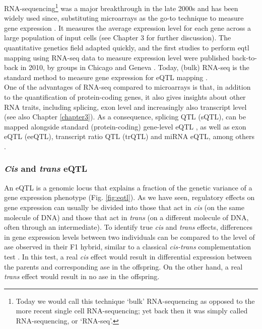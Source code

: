 RNA-sequencing\footnote{Today we would call this technique `bulk' RNA-sequencing as opposed to the more recent single cell RNA-sequencing; yet back then it was simply called RNA-sequencing, or `RNA-seq'.} was a major breakthrough in the late 2000s 
and has been widely used since, substituting microarrays as the go-to technique to measure gene expression \cite{weber2015discovering}.
It measures the average expression level for each gene across a large population 
of input cells (see Chapter 3 for further discussion).
The quantitative genetics field adapted quickly, and the first studies to perform \gls{eqtl} mapping using RNA-seq data to measure expression level were published back-to-back in 2010, by groups in Chicago and Geneva
\cite{montgomery2010transcriptome, pickrell2010understanding}.
Today, (bulk) RNA-seq is the standard method to measure gene expression for eQTL mapping \cite{lappalainen2013transcriptome, gtex2015genotype, chen2016genetic}.\\

One of the advantages of RNA-seq compared to microarrays is that, in addition to the quantification of protein-coding genes, it also  gives insights about other RNA traits, including splicing, exon level and increasingly also transcript level (see also Chapter
\ref{chapter3}).
As a consequence, splicing QTL (sQTL), can be mapped alongside standard (protein-coding) gene-level eQTL \cite{pickrell2010understanding, montgomery2010transcriptome}, as well as exon eQTL (eeQTL), transcript ratio QTL (trQTL) and miRNA eQTL, among others \cite{lappalainen2013transcriptome, bonder2019systematic}.
 
\subsubsection{\textit{Cis} and \textit{trans} eQTL}

An eQTL is a genomic locus that explains a fraction of the genetic variance of a gene expression phenotype (Fig. \ref{fig:eqtl}). 
As we have seen, regulatory effects on gene expression can usually be divided into those that act in \textit{cis} (on the same molecule of DNA) and those that act in \textit{trans} (on a different molecule of DNA, often through an intermediate).
To identify true \textit{cis} and \textit{trans} effects, differences in gene expression levels between two individuals can be compared to the level of \gls{ase} observed in their F1 hybrid, similar to a classical \textit{cis-trans} complementation test \cite{mcmanus2010regulatory, goncalves2012extensive}. 
In this test, a real \textit{cis} effect would result in differential expression between the parents and corresponding \gls{ase} in the offspring. 
On the other hand, a real \textit{trans} effect would result in no \gls{ase} in the offspring. \\

